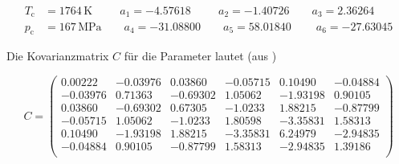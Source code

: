 \begin{equation}
\label{eq:params}
\begin{split}
T_{\text{c}} &= 1764\,\text{K} \ \: \qquad a_1=-4.57618  \ \: \qquad a_2=-1.40726        \qquad a_3=2.36264\\
p_{\text{c}} &= 167\,\text{MPa}     \qquad a_4=-31.08800      \qquad a_5=58.01840  \  \qquad a_6=-27.63045
\end{split}
\end{equation}

Die Kovarianzmatrix $C$ für die Parameter lautet (aus \cite{manual})

\begin{equation}
\label{eq:cov}
C=
\left(
\begin{array}{cccccc}
 0.00222 & -0.03976 & 0.03860 & -0.05715 & 0.10490 & -0.04884 \\
 -0.03976 & 0.71363 & -0.69302 & 1.05062 & -1.93198 & 0.90105 \\
 0.03860 & -0.69302 & 0.67305 & -1.0233 & 1.88215 & -0.87799 \\
 -0.05715 & 1.05062 & -1.0233 & 1.80598 & -3.35831 & 1.58313 \\
 0.10490 & -1.93198 & 1.88215 & -3.35831 & 6.24979 & -2.94835 \\
 -0.04884 & 0.90105 & -0.87799 & 1.58313 & -2.94835 & 1.39186 \\
\end{array}
\right)
\end{equation}